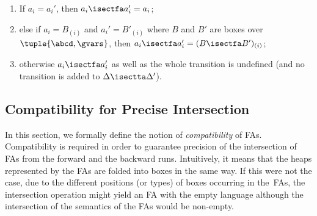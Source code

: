     \begin{enumerate}
		\item If $a_i = a_i'$, then $a_i \isectfa a_i' = a_i$;  
      \item else if $a_i = B_{(i)}$ and $a_i' = B'_{(i)}$ where $B$ and $B'$ are boxes over $\tuple{\abcd,\gvars}$, 
				then $a_i\isectfa a_i' = (B\isectfa B')_{(i)}$;
		\item otherwise $a_i \isectfa a_i'$ as well as the whole transition is undefined (and no transition is added to $\Delta \isectta \Delta'$). 
    \end{enumerate}

\subsection{Compatibility for Precise Intersection}\label{sec:compatibility}

In this section, we formally define the notion of \emph{compatibility} of FAs.
Compatibility is required in order to guarantee precision of the intersection of FAs
from the forward and the backward runs.
Intuitively, it means that the heaps represented by the FAs are folded into
boxes in the same way.
If this were not the case, due to the different positions (or types) of boxes
occurring in the~FAs, the intersection operation might yield an FA with the
empty language although the intersection of the semantics of the FAs would be non-empty.

